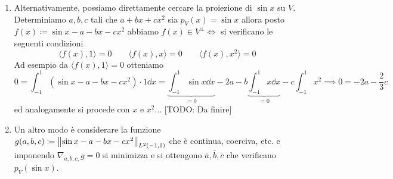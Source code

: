 \begin{enumerate}
\item Alternativamente, possiamo direttamente cercare la proiezione di $\sin x$ su $V$. Determiniamo $a, b, c$ tali che $a + b x + c x^2$ sia $p_V(x) = \sin x$ allora posto $f(x) \coloneqq \sin x - a - b x - c x^2$ abbiamo $f(x) \in V^\perp \iff $ si verificano le seguenti condizioni
$$
\langle f(x), 1 \rangle = 0
\qquad
\langle f(x), x \rangle = 0
\qquad
\langle f(x), x^2 \rangle = 0
$$
Ad esempio da $\langle f(x), 1 \rangle = 0$ otteniamo
$$
0 = \int_{-1}^1 (\sin x - a - b x - c x^2) \cdot 1 \dd x 
= \underbrace{\int_{-1}^1 \sin x \dd x}_{=0} - 2a - b \underbrace{\int_{-1}^1 x \dd x}_{=0} - c \int_{-1}^1 x^2
\implies 0 = -2a - \frac{2}{3}c
$$
ed analogamente si procede con $x$ e $x^2$... [TODO: Da finire]

\item Un altro modo è considerare la funzione $g(a, b, c) \coloneqq \left\lVert \sin x - a - bx - cx^2 \right\rVert_{L^2(-1, 1)}$ che è continua, coerciva, etc. e imponendo $\nabla_{a,b,c,} g = 0$ si minimizza e si ottengono $\bar a, \bar b, \bar c$ che verificano $p_V(\sin x)$.

\end{enumerate}







